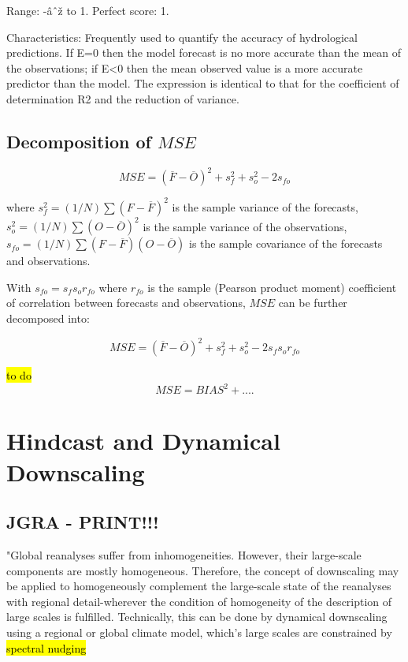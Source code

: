 \documentclass[12pt,a4paper]{article}
\begin{document}
Range: -âˆž to 1.  Perfect score: 1.

Characteristics: Frequently used to quantify the accuracy of hydrological predictions. If E=0 then the model forecast is no more accurate than the mean of the observations; if E<0 then the mean observed value is a more accurate predictor than the model. The expression is identical to that for the coefficient of determination R2 and the reduction of variance.

\subsection{Decomposition of $MSE$}

\cite{Murphy1988}

\begin{equation}
    MSE = (\overline{F} - \overline{O})^2 + s^2_f + s^2_o - 2s_{fo}
\end{equation}

where $s^2_f = (1/N) \sum (F - \overline{F})^2$ is the sample variance of the forecasts, $s^2_o = (1/N) \sum (O - \overline{O})^2$ is the sample variance of the observations,  $s_{fo} = (1/N) \sum (F - \overline{F}) (O - \overline{O})$ is the sample covariance of the forecasts and observations. 

With $s_{fo} = s_f s_o r_{fo}$ where $r_{fo}$ is the sample (Pearson product moment) coefficient of correlation between forecasts and observations, $MSE$ can be further decomposed into:

\begin{equation}
    MSE = (\overline{F} - \overline{O})^2 + s^2_f + s^2_o - 2s_f s_o r_{fo}
\end{equation}

\hl{to do}
\begin{equation}
    MSE = BIAS^2 + ....
\end{equation}



\section{Hindcast and Dynamical Downscaling }

\subsection{\cite{VonStorch2017} JGRA - PRINT!!!}

"Global reanalyses suffer from inhomogeneities. However, their large-scale components are mostly homogeneous. Therefore, the concept of downscaling may be applied to homogeneously complement the large-scale state of the reanalyses with regional detail-wherever the condition of homogeneity of the description of large scales is fulfilled. Technically, this can be done by dynamical downscaling using a regional or global climate model, which's large scales are constrained by \hl{spectral nudging}
\end{document}
